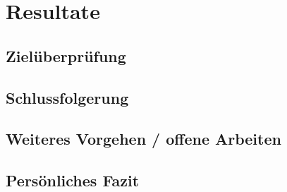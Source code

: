 
\chapter{Resultate}
\section{Zielüberprüfung}
\section{Schlussfolgerung}
\section{Weiteres Vorgehen / offene Arbeiten}
\section{Persönliches Fazit}